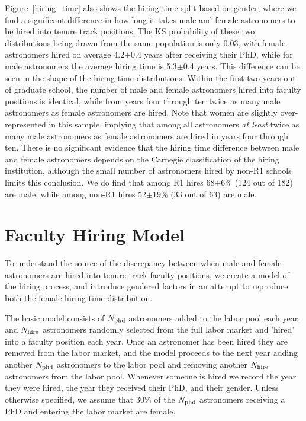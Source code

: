 \documentclass[modern]{aastex62}
\begin{document}
Figure~\ref{hiring_time} also shows the hiring time split based on gender, where we find a significant difference in how long it takes male and female astronomers to be hired into tenure track positions. The KS probability of these two distributions being drawn from the same population is only 0.03, with female astronomers hired on average 4.2$\pm$0.4 years after receiving their PhD, while for male astronomers the average hiring time is 5.3$\pm$0.4 years. This difference can be seen in the shape of the hiring time distributions. Within the first two years out of graduate school, the number of male and female astronomers hired into faculty positions is identical, while from years four through ten twice as many male astronomers as female astronomers are hired. Note that women are slightly over-represented in this sample, implying that among all astronomers {\it at least} twice as many male astronomers as female astronomers are hired in years four through ten. There is no significant evidence that the hiring time difference between male and female astronomers depends on the Carnegie classification of the hiring institution, although the small number of astronomers hired by non-R1 schools limits this conclusion. We do find that among R1 hires 68$\pm$6\% (124 out of 182) are male, while among non-R1 hires 52$\pm$19\% (33 out of 63) are male.




\section{Faculty Hiring Model\label{model}}
To understand the source of the discrepancy between when male and female astronomers are hired into tenure track faculty positions, we create a model of the hiring process, and introduce gendered factors in an attempt to reproduce both the female hiring time distribution.

The basic model consists of $N_{\rm phd}$ astronomers added to the labor pool each year, and $N_{\rm hire}$ astronomers randomly selected from the full labor market and 'hired' into a faculty position each year. Once an astronomer has been hired they are removed from the labor market, and the model proceeds to the next year adding another $N_{\rm phd}$ astronomers to the labor pool and removing another $N_{\rm hire}$ astronomers from the labor pool. Whenever someone is hired we record the year they were hired, the year they received their PhD, and their gender. Unless otherwise specified, we assume that 30\% of the $N_{\rm phd}$ astronomers receiving a PhD and entering the labor market are female. 
\end{document}
